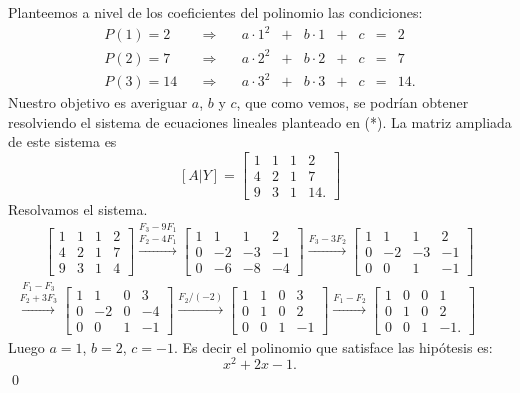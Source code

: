\begin{enumerate}[topsep=6pt, itemsep=.4cm]
\rta Planteemos a nivel de los coeficientes del polinomio las condiciones:
\begin{equation*}
 \begin{array}{rrrrrrrrr}
 P(1) =2 &\quad \Rightarrow \quad& a\cdot 1^2 &+ & b \cdot 1 &+ & c &= & 2 \\   
 P(2) =7 &\quad \Rightarrow \quad& a\cdot 2^2 &+ & b \cdot 2 &+ & c &= & 7 \\
 P(3) =14 &\quad \Rightarrow \quad& a\cdot 3^2 &+ & b \cdot 3 &+ & c &= & 14.    
\end{array} \tag{*}
\end{equation*}
Nuestro objetivo es averiguar $a$, $b$ y $c$,  que como vemos, se podrían obtener resolviendo el sistema de ecuaciones lineales planteado en (*). La matriz ampliada de este sistema es 
$$
[A|Y] = \left[\begin{array}{ccc|c}
1&1&1&2 \\
4&2&1&7\\
9&3&1&14.
\end{array}\right]
$$
Resolvamos el sistema.
\begin{multline*}\qquad
\left[\begin{array}{ccc|c}
1&1&1&2 \\
4&2&1&7\\
9&3&1&4
\end{array}\right] \stackrel{F_3 - 9F_1}{\stackrel{F_2 - 4 F_1}{\longrightarrow}}
\left[\begin{array}{ccc|c}
1&1&1&2 \\
0&-2&-3&-1\\
0&-6&-8&-4
\end{array}\right]\stackrel{F_3 - 3 F_2}{\longrightarrow}
\left[\begin{array}{ccc|c}
1&1&1&2 \\
0&-2&-3&-1\\
0&0&1&-1
\end{array}\right] \\
\stackrel{F_1 - F_3}{\stackrel{F_2 + 3 F_3}{\longrightarrow}}
\left[\begin{array}{ccc|c}
1&1&0&3 \\
0&-2&0&-4\\
0&0&1&-1
\end{array}\right]\stackrel{F_2/(-2)}{\longrightarrow}
\left[\begin{array}{ccc|c}
1&1&0&3 \\
0&1&0&2\\
0&0&1&-1
\end{array}\right]\stackrel{F_1 -F_2}{\longrightarrow}
\left[\begin{array}{ccc|c}
1&0&0&1 \\
0&1&0&2\\
0&0&1&-1.
\end{array}\right]
\qquad
\end{multline*}
Luego $a = 1$, $b =2$, $c=-1$. Es decir el polinomio que satisface las hipótesis es:
$$
x^2 + 2x -1.
$$
\qed


\end{enumerate}
